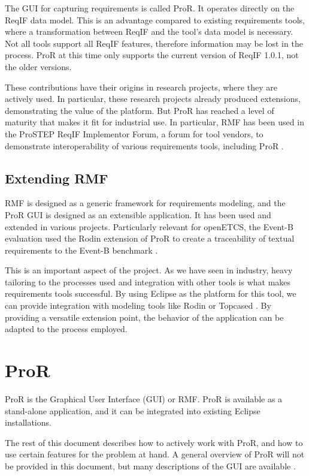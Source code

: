 \documentclass{template/openetcs_report}
\begin{document}
The GUI for capturing requirements is called ProR.  It operates directly on the ReqIF data model.  This is an advantage compared to existing requirements tools, where a transformation between ReqIF and the tool's data model is necessary.  Not all tools support all ReqIF features, therefore information may be lost in the process.  ProR at this time only supports the current version of ReqIF 1.0.1, not the older versions.

These contributions have their origins in research projects, where they are actively used. In particular, these research projects already produced extensions, demonstrating the value of the platform.  But ProR has reached a level of maturity that makes it fit for industrial use.  In particular, RMF has been used in the ProSTEP ReqIF Implementor Forum, a forum for tool vendors, to demonstrate interoperability of various requirements tools, including ProR \cite{prostep_if}.

\subsection{Extending RMF}

RMF is designed as a generic framework for requirements modeling, and the ProR GUI is designed as an extensible application.  It has been used and extended in various projects. Particularly relevant for openETCS, the Event-B evaluation used the Rodin extension of ProR to create a traceability of textual requirements to the Event-B benchmark \cite{event_b_benchmark}.

This is an important aspect of the project.  As we have seen in industry, heavy tailoring to the processes used and integration with other tools is what makes requirements tools successful.  By using Eclipse as the platform for this tool, we can provide integration with modeling tools like Rodin \cite{jastram_forms_2012} or Topcased \cite{topcase-JaGr2011}.  By providing a versatile extension point, the behavior of the application can be adapted to the process employed.

\section{ProR}
\label{pror}

ProR is the Graphical User Interface (GUI) or RMF.  ProR is available as a stand-alone application, and it can be integrated into existing Eclipse installations.  

The rest of this document describes how to actively work with ProR, and how to use certain features for the problem at hand.  A general overview of ProR will not be provided in this document, but many descriptions of the GUI are available \cite{RMF_Mark_Book_Jastram_2013, reqif_ObjektSpektrum_2013}.  
\end{document}
